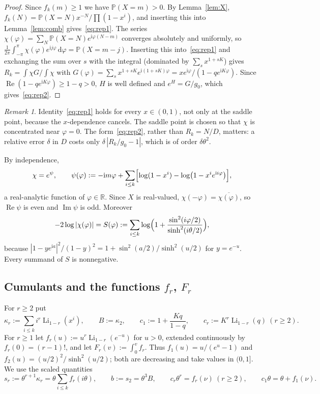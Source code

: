 \documentclass[11pt]{amsart}
\theoremstyle{definition}
\theoremstyle{remark}
\newtheorem{remark}[theorem]{Remark}
\numberwithin{equation}{section}
\newcommand{\RR}{\mathbb{R}}
\newcommand{\Li}{\operatorname{Li}}
\newcommand{\re}{\operatorname{Re}}
\newcommand{\im}{\operatorname{Im}}
\newcommand{\Prob}{\mathbb{P}}
\newcommand{\dd}{\,\mathrm{d}}
\newcommand{\ii}{\mathrm{i}}
\begin{document}
\begin{proof}
Since $f_k(m)\ge1$ we have $\Prob(X=m)>0$. By Lemma~\ref{lem:X}, $f_k(N)=\Prob(X=N)x^{-N}/\prod(1-x^i)$, and inserting this into
Lemma~\ref{lem:comb} gives~\eqref{eq:rep1}. The series $\chi(\varphi)=\sum_N\Prob(X=N)e^{\ii\varphi(N-m)}$ converges absolutely and
uniformly, so $\frac1{2\pi}\int_{-\pi}^{\pi}\chi(\varphi)e^{\ii j\varphi}\dd\varphi=\Prob(X=m-j)$. Inserting this into~\eqref{eq:rep1} and
exchanging the sum over $s$ with the integral (dominated by $\sum_s x^{1+sK}$) gives
$R_k=\int\chi G/\int\chi$ with $G(\varphi)=\sum_s x^{1+sK}e^{\ii(1+sK)\varphi}=xe^{\ii\varphi}/(1-qe^{\ii K\varphi})$. Since
$\re(1-qe^{\ii K\varphi})\ge1-q>0$, $H$ is well defined and $e^H=G/g_0$, which gives~\eqref{eq:rep2}.
\end{proof}

\begin{remark}
Identity~\eqref{eq:rep1} holds for every $x\in(0,1)$, not only at the saddle point, because the $x$-dependence cancels. The
saddle point is chosen so that $\chi$ is concentrated near $\varphi=0$. The form~\eqref{eq:rep2}, rather than $R_k=N/D$, matters:
a relative error $\delta$ in $D$ costs only $\delta\,|R_k/g_0-1|$, which is of order $\delta\theta^2$.
\end{remark}

By independence,
\begin{equation}\label{eq:psi}
  \chi=e^{\psi},\qquad \psi(\varphi):=-\ii m\varphi+\sum_{i\le k}\Bigl[\log(1-x^i)-\log\bigl(1-x^ie^{\ii i\varphi}\bigr)\Bigr],
\end{equation}
a real-analytic function of $\varphi\in\RR$. Since $X$ is real-valued, $\chi(-\varphi)=\overline{\chi(\varphi)}$, so
$\re\psi$ is even and $\im\psi$ is odd. Moreover
\begin{equation}\label{eq:modchi}
  -2\log|\chi(\varphi)|=S(\varphi):=\sum_{i\le k}\log\Bigl(1+\frac{\sin^2(i\varphi/2)}{\sinh^2(i\theta/2)}\Bigr),
\end{equation}
because $|1-ye^{\ii a}|^2/(1-y)^2=1+\sin^2(a/2)/\sinh^2(u/2)$ for $y=e^{-u}$. Every summand of $S$ is nonnegative.

\subsection{Cumulants and the functions \texorpdfstring{$f_r$, $F_r$}{f\_r, F\_r}}
For $r\ge2$ put
\begin{equation}\label{eq:kappa}
  \kappa_r:=\sum_{i\le k}i^r\Li_{1-r}(x^i),\qquad B:=\kappa_2,\qquad
  c_1:=1+\frac{Kq}{1-q},\qquad c_r:=K^r\Li_{1-r}(q)\ (r\ge2).
\end{equation}
For $r\ge1$ let $f_r(u):=u^r\Li_{1-r}(e^{-u})$ for $u>0$, extended continuously by $f_r(0)=(r-1)!$, and let
$F_r(v):=\int_0^vf_r$. Thus $f_1(u)=u/(e^u-1)$ and $f_2(u)=(u/2)^2/\sinh^2(u/2)$; both are decreasing and take values in $(0,1]$.
We use the scaled quantities
\begin{equation}\label{eq:scaled}
  s_r:=\theta^{r+1}\kappa_r=\theta\sum_{i\le k}f_r(i\theta),\qquad b:=s_2=\theta^3B,\qquad c_r\theta^r=f_r(\nu)\ (r\ge2),
  \qquad c_1\theta=\theta+f_1(\nu).
\end{equation}
\end{document}
